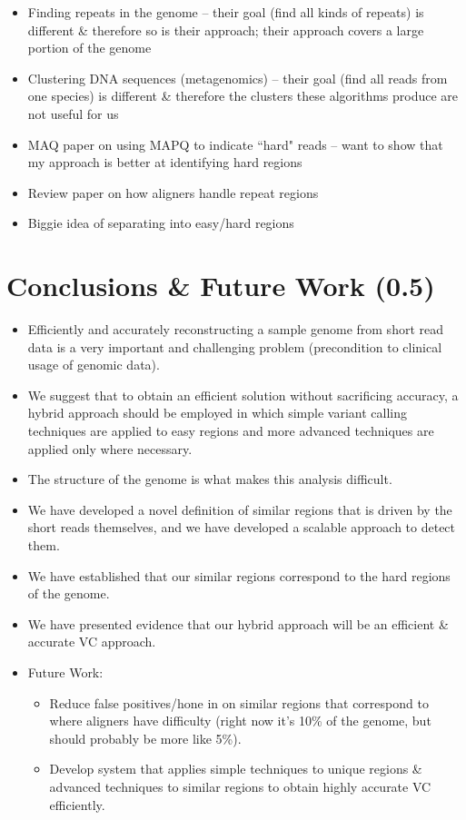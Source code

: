 \documentclass[10pt, conference, compsocconf]{IEEEtran}
\begin{document}
\begin{itemize}
\item{Finding repeats in the genome -- their goal (find all kinds of repeats) is different \& therefore so is their approach; their approach covers a large portion of the genome}
\item{Clustering DNA sequences (metagenomics) -- their goal (find all reads from one species) is different \& therefore the clusters these algorithms produce are not useful for us}
\item{MAQ paper on using MAPQ to indicate ``hard" reads -- want to show that my approach is better at identifying hard regions}
\item{Review paper on how aligners handle repeat regions}
\item{Biggie idea of separating into easy/hard regions}
\end{itemize}

\section{Conclusions \& Future Work (0.5)}

\begin{itemize}
\item{Efficiently and accurately reconstructing a sample genome from short read data is a very important and challenging problem (precondition to clinical usage of genomic data).}
\item{We suggest that to obtain an efficient solution without sacrificing accuracy, a hybrid approach should be employed in which simple variant calling techniques are applied to easy regions and more advanced techniques are applied only where necessary.}
\item{The structure of the genome is what makes this analysis difficult.}
\item{We have developed a novel definition of similar regions that is driven by the short reads themselves, and we have developed a scalable approach to detect them.}
\item{We have established that our similar regions correspond to the hard regions of the genome.}
\item{We have presented evidence that our hybrid approach will be an efficient \& accurate VC approach.}
\item{Future Work:}
\begin{itemize}
\item{Reduce false positives/hone in on similar regions that correspond to where aligners have difficulty (right now it's 10\% of the genome, but should probably be more like 5\%).}
\item{Develop system that applies simple techniques to unique regions \& advanced techniques to similar regions to obtain highly accurate VC efficiently.}
\end{itemize}
\end{itemize}
\end{document}
